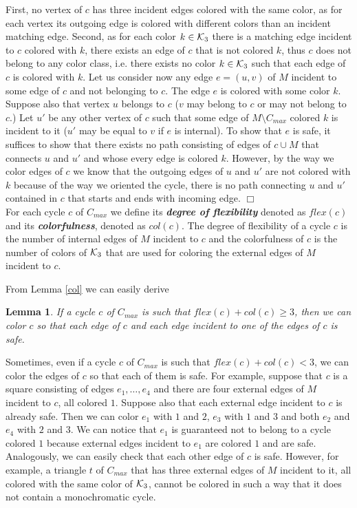 \documentclass[a4, 11pt]{article}
\newcommand{\koniec}{\hfill $\Box$\\[.1ex]}
\newcommand{\<}{\langle}
\renewcommand{\>}{\rangle}
\newcommand{\Kt}{{\cal K}_3}
\newtheorem{lemma}{Lemma}
\begin{document}
First, no vertex of $c$ has three incident edges colored with the same color, as for each vertex its outgoing edge is colored with different colors than an incident matching edge.  Second, as for each color $k \in \Kt$ there is a matching edge incident to $c$ colored with $k$, there exists an edge of $c$ that is not colored $k$, thus $c$ does not belong to any color class, i.e. there exists no color $k \in \Kt$ such that each edge of $c$ is colored with $k$.  Let us consider now any edge $e=(u,v)$  of $M$ incident to some edge of $c$ and not belonging to $c$.  The edge $e$ is colored with some color $k$. 
Suppose also that  vertex  $u$ belongs to $c$ ($v$ may  belong to $c$ or  may not belong to $c$.) Let $u'$ be any other vertex of $c$ such that some edge of $M\setminus C_{max}$  colored $k$ is incident to it  ($u'$ may be equal to $v$ if $e$ is internal). 
To show that $e$ is safe, it suffices to show that there exists no path consisting of edges of $c \cup M$ that connects $u$ and $u'$ and whose every edge is colored $k$.  However, by the way we color edges of $c$ we know that the outgoing edges of $u$ and $u'$ are not colored with $k$ because of the way we oriented the cycle, there is no path connecting $u$ and $u'$ contained in $c$ that starts and ends with incoming edge. \koniec

For each cycle $c$ of $C_{max}$ we define its {\bf \em degree of flexibility} denoted as $flex(c)$ and its {\bf \em colorfulness}, denoted as $col(c)$. The degree of flexibility of a cycle $c$  is the number of internal edges of $M$ incident to  $c$
and the colorfulness of $c$ is the number of colors of $\Kt$ that are used for coloring the external edges of $M$ incident to $c$.

From Lemma \ref{col} we can easily derive 
\begin{lemma}\label{cola}
If a cycle $c$ of $C_{max}$ is such that $flex(c)+col(c) \geq 3$, then we can color $c$ so that each edge of $c$ and each edge incident to one of the edges of $c$ is safe.
\end{lemma}

Sometimes, even if a cycle $c$ of $C_{max}$ is such that  $flex(c)+col(c) < 3$, we can color the edges of $c$ so that each of them is safe.
For example, suppose that $c$ is a square consisting of edges $e_1, \ldots, e_4$  and there are four external edges of $M$ incident to $c$, all colored  $1$. Suppose also that each external edge incident to $c$ is already safe. Then we can color $e_1$ with $1$ and $2$,
$e_3$ with $1$ and $3$ and both $e_2$ and $e_4$ with $2$ and $3$. We can notice that $e_1$ is guaranteed not to belong to a cycle colored $1$ because external edges incident to $e_1$ are colored $1$ and are safe. Analogously, we can easily check that each other  edge of $c$ is safe. However, for example, a triangle $t$ of $C_{max}$ that has three external edges of $M$ incident to it, all colored with the same color of $\Kt$, cannot be colored in such a way that it does not contain a monochromatic cycle.
\end{document}
